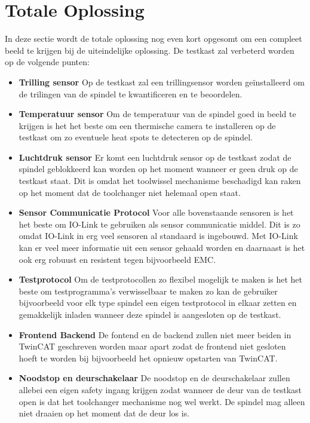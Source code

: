 \section{Totale Oplossing}

In deze sectie wordt de totale oplossing nog even kort opgesomt om een compleet beeld te krijgen bij de uiteindelijke oplossing. De testkast zal verbeterd worden op de volgende punten:

\begin{itemize}
	\item \textbf{Trilling sensor} Op de testkast zal een trillingsensor worden geïnstalleerd om de trilingen van de spindel te kwantificeren en te beoordelen.
	
	\item \textbf{Temperatuur sensor} Om de temperatuur van de spindel goed in beeld te krijgen is het het beste om een thermische camera te installeren op de testkast om zo eventuele heat spots te detecteren op de spindel.
	
	\item \textbf{Luchtdruk sensor} Er komt een luchtdruk sensor op de testkast zodat de spindel geblokkeerd kan worden op het moment wanneer er geen druk op de testkast staat. Dit is omdat het toolwissel mechanisme beschadigd kan raken op het moment dat de toolchanger niet helemaal open staat.
	
	\item \textbf{Sensor Communicatie Protocol} Voor alle bovenstaande sensoren is het het beste om IO-Link te gebruiken als sensor communicatie middel. Dit is zo omdat IO-Link in erg veel sensoren al standaard is ingebouwd. Met IO-Link kan er veel meer informatie uit een sensor gehaald worden en daarnaast is het ook erg robuust en resistent tegen bijvoorbeeld \gls{EMC}.
	
	\item \textbf{Testprotocol} Om de testprotocollen zo flexibel mogelijk te maken is het het beste om testprogramma's verwisselbaar te maken zo kan de gebruiker bijvoorbeeld voor elk type spindel een eigen testprotocol in elkaar zetten en gemakkelijk inladen wanneer deze spindel is aangesloten op de testkast.
	
	\item \textbf{Frontend Backend} De fontend en de backend zullen niet meer beiden in TwinCAT geschreven worden maar apart zodat de frontend niet gesloten hoeft te worden bij bijvoorbeeld het opnieuw opstarten van TwinCAT.
	
	\item \textbf{Noodstop en deurschakelaar} De noodstop en de deurschakelaar zullen allebei een eigen safety ingang krijgen zodat wanneer de deur van de testkast open is dat het toolchanger mechanisme nog wel werkt. De spindel mag alleen niet draaien op het moment dat de deur los is.
\end{itemize}
	